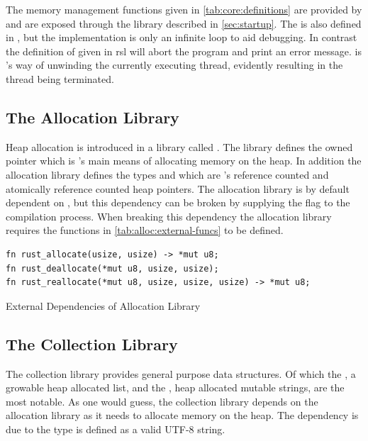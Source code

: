 The memory management functions given in \autoref{tab:core:definitions} are provided by  and are exposed through the  library described in \autoref{sec:startup}.
The  is also defined in , but the implementation is only an infinite loop to aid debugging.
In contrast the definition of  given in \gls{rsl} will abort the program and print an error message.
 is {\rust}'s way of unwinding the currently executing thread, evidently resulting in the thread being terminated.

\subsection{The Allocation Library}
\label{sec:rust:allocation}

Heap allocation is introduced in a library called .
The library defines the owned pointer  which is {\rust}'s main means of allocating memory on the heap.
In addition the allocation library defines the types  and  which are {\rust}'s reference counted and atomically reference counted heap pointers.
The allocation library is by default dependent on , but this dependency can be broken by supplying the  flag to the compilation process.
When breaking this dependency the allocation library requires the functions in \autoref{tab:alloc:external-funcs} to be defined.

\begin{listing}[H]
  \begin{verbatim}
fn rust_allocate(usize, usize) -> *mut u8;
fn rust_deallocate(*mut u8, usize, usize);
fn rust_reallocate(*mut u8, usize, usize, usize) -> *mut u8;
  \end{verbatim}
  \caption{External Dependencies of Allocation Library}
  \label{tab:alloc:external-funcs}
\end{listing}

\subsection{The Collection Library}

The {\rust} collection library provides general purpose data structures.
Of which the , a growable heap allocated list, and the , heap allocated mutable strings, are the most notable.
As one would guess, the collection library depends on the allocation library as it needs to allocate memory on the heap.
The  dependency is due to the  type is defined as a valid UTF-8 string.
